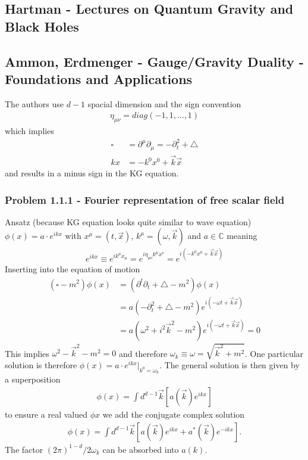 \documentclass[10pt,a4paper]{article}
\theoremstyle{definition}
\begin{document}
\subsection{{\sc Hartman} - Lectures on Quantum Gravity and Black Holes}


\subsection{{\sc Ammon, Erdmenger} - Gauge/Gravity Duality - Foundations and Applications}
The authors use $d-1$ spacial dimension and the sign convention 
\begin{align}
\eta_{\mu\nu}=diag(-1,1,...,1)
\end{align}
which implies 
\begin{align}
    \square&=\partial^\mu\partial_\mu=-\partial_t^2+\triangle\\
    kx&=-k^0x^0+\vec{k}\vec{x}
\end{align}
and results in a minus sign in the KG equation.

\subsubsection{Problem 1.1.1 - Fourier representation of free scalar field}
Ansatz (because KG equation looks quite similar to wave equation) $\phi(x)=a\cdot e^{ikx}$ with $x^\mu=(t,\vec{x})$, $k^\mu=(\omega,\vec{k})$ and $a\in\mathbb{C}$ meaning 
\begin{align}
    e^{ikx}\equiv e^{ik^{\mu}x_{\mu}}=e^{i\eta_{\mu\nu}k^{\mu}x^{\nu}}=e^{i(-k^0x^0+\vec{k}\vec{x})}
\end{align}
Inserting into the equation of motion
\begin{align}
    (\square - m^2)\phi(x)&=(\partial^t\partial_t + \triangle - m^2)\phi(x)\\
    &=a(-\partial_t^2 + \triangle - m^2)e^{i(-\omega t+\vec{k}\vec{x})}\\
    &=a\left(\omega^2 + i^2\vec{k}^2 - m^2\right)e^{i(-\omega t+\vec{k}\vec{x})}=0 
\end{align}
This implies $\omega^2-\vec{k}^2-m^2=0$ and therefore $\omega_k\equiv\omega=\sqrt{\vec{k}^2+m^2}$. One particular solution is therefore $\phi(x)=a\cdot e^{ikx}|_{k^0=\omega_k}$. The general solution is then given by a superposition
\begin{align}
    \phi(x)=\int d^{d-1}\vec{k}\left[a(\vec{k})e^{ikx}\right]
\end{align}
to ensure a real valued $\phi{x}$ we add the conjugate complex solution
\begin{align}
    \phi(x)=\int d^{d-1}\vec{k}\left[a(\vec{k})e^{ikx} + a^*(\vec{k})e^{-ikx}\right].
\end{align}
The factor $(2\pi)^{1-d}/2\omega_k$ can be absorbed into $a(k)$.
\end{document}

